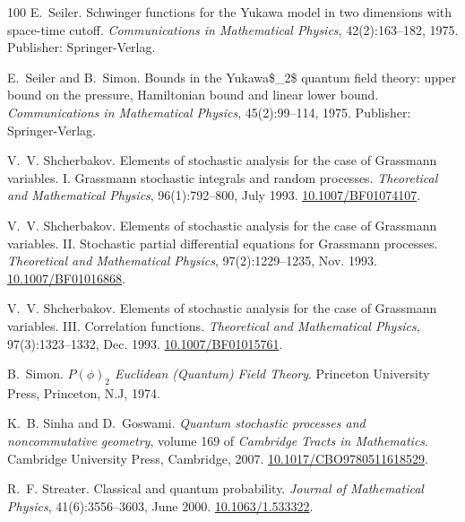 \documentclass[11pt]{article}
\newcommand{\tmtextit}[1]{{\itshape{#1}}}
\begin{document}
\begin{thebibliography}{100}
  E.~Seiler. {\newblock}Schwinger
  functions for the Yukawa model in two dimensions with space-time cutoff.
  {\newblock}\tmtextit{Communications in Mathematical Physics},
  42(2):163--182, 1975. {\newblock}Publisher: Springer-Verlag.
  
  E.~Seiler and B.~Simon. {\newblock}Bounds
  in the Yukawa\$\_2\$ quantum field theory: upper bound on the pressure,
  Hamiltonian bound and linear lower bound.
  {\newblock}\tmtextit{Communications in Mathematical Physics}, 45(2):99--114,
  1975. {\newblock}Publisher: Springer-Verlag.
  
  V.~V. Shcherbakov.
  {\newblock}Elements of stochastic analysis for the case of Grassmann
  variables. I. Grassmann stochastic integrals and random processes.
  {\newblock}\tmtextit{Theoretical and Mathematical Physics}, 96(1):792--800,
  July 1993.
  {\newblock}\href{https://doi.org/10.1007/BF01074107}{10.1007/BF01074107}.
  
  V.~V. Shcherbakov.
  {\newblock}Elements of stochastic analysis for the case of Grassmann
  variables. II. Stochastic partial differential equations for Grassmann
  processes. {\newblock}\tmtextit{Theoretical and Mathematical Physics},
  97(2):1229--1235, Nov. 1993.
  {\newblock}\href{https://doi.org/10.1007/BF01016868}{10.1007/BF01016868}.
  
  V.~V. Shcherbakov.
  {\newblock}Elements of stochastic analysis for the case of Grassmann
  variables. III. Correlation functions. {\newblock}\tmtextit{Theoretical and
  Mathematical Physics}, 97(3):1323--1332, Dec. 1993.
  {\newblock}\href{https://doi.org/10.1007/BF01015761}{10.1007/BF01015761}.
  
  B.~Simon. {\newblock}\tmtextit{$P (\phi)_2$
  Euclidean (Quantum) Field Theory}. {\newblock}Princeton University Press,
  Princeton, N.J, 1974.
  
  K.~B. Sinha and D.~Goswami. {\newblock}\tmtextit{Quantum
  stochastic processes and noncommutative geometry}, volume 169 of
  \tmtextit{Cambridge Tracts in Mathematics}. {\newblock}Cambridge University
  Press, Cambridge, 2007. {\newblock}
  \href{https://doi.org/10.1017/CBO9780511618529}{10.1017/CBO9780511618529}.
  
  R.~F. Streater. {\newblock}Classical
  and quantum probability. {\newblock}\tmtextit{Journal of Mathematical
  Physics}, 41(6):3556--3603, June 2000.
  {\newblock}\href{https://doi.org/10.1063/1.533322}{10.1063/1.533322}.
  

\end{thebibliography}
\end{document}
